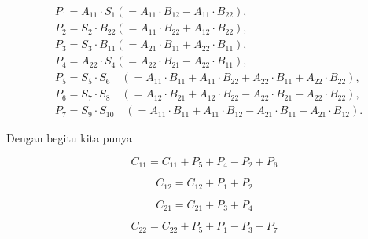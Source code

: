 \documentclass[
  letterpaper,
  DIV=11,
  numbers=noendperiod]{scrartcl}
\begin{document}
\[
\begin{aligned}
& P_1=A_{11} \cdot S_1\left(=A_{11} \cdot B_{12}-A_{11} \cdot B_{22}\right), \\
& P_2=S_2 \cdot B_{22}\left(=A_{11} \cdot B_{22}+A_{12} \cdot B_{22}\right), \\
& P_3=S_3 \cdot B_{11}\left(=A_{21} \cdot B_{11}+A_{22} \cdot B_{11}\right), \\
& P_4=A_{22} \cdot S_4\left(=A_{22} \cdot B_{21}-A_{22} \cdot B_{11}\right), \\
& P_5=S_5 \cdot S_6 \quad\left(=A_{11} \cdot B_{11}+A_{11} \cdot B_{22}+A_{22} \cdot B_{11}+A_{22} \cdot B_{22}\right), \\
& P_6=S_7 \cdot S_8 \quad\left(=A_{12} \cdot B_{21}+A_{12} \cdot B_{22}-A_{22} \cdot B_{21}-A_{22} \cdot B_{22}\right), \\
& P_7=S_9 \cdot S_{10} \quad\left(=A_{11} \cdot B_{11}+A_{11} \cdot B_{12}-A_{21} \cdot B_{11}-A_{21} \cdot B_{12}\right) .
\end{aligned}
\]

Dengan begitu kita punya

\[
C_{11} =C_{11}+P_5+P_4-P_2+P_6
\]

\[
C_{12} = C_{12}+P_1+P_2
\]

\[
C_{21} = C_{21}+P_3+P_4
\]

\[
C_{22} = C_{22}+P_5+P_1-P_3-P_7
\]
\end{document}
